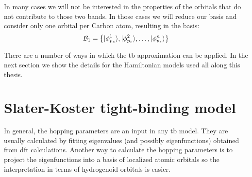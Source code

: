 In many cases we will not be interested in the properties of the orbitals that do not contribute to those two bands. In those cases we will reduce our basis and consider only one orbital per Carbon atom, resulting in the basis:
\begin{equation}
  \mathcal{B}_1 = \left\{|\phi^1_{p_z}\rangle, |\phi^2_{p_z}\rangle,\dots, |\phi^n_{p_z}\rangle\right\}
\label{basis1}
\end{equation}
\medskip

There are a number of ways in which the \ac{tb} approximation can be applied. In the next section we show the details for the Hamiltonian models used all along this thesis.


\section{Slater-Koster tight-binding model}
\label{ssec:SK}
In general, the hopping parameters are an input in any \acf{tb} model. They are usually calculated by fitting eigenvalues (and possibly eigenfunctions) obtained from \ac{dft} calculations. Another way to calculate the hopping parameters is to project the eigenfunctions into a basis of localized atomic orbitals so the interpretation in terms of hydrogenoid orbitals is easier.


